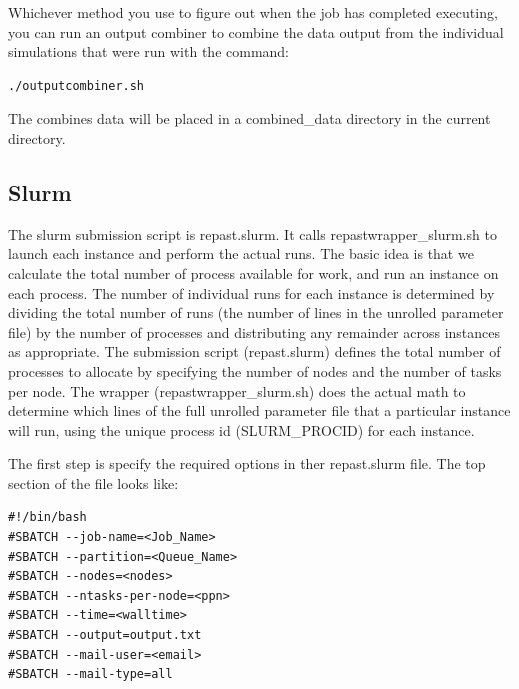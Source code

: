\documentclass[11pt]{amsart}
\begin{document}
Whichever method you use to figure out when the job has completed executing, you can run an output combiner to combine the data output from the individual simulations that were run with the command:
\begin{verbatim}
./outputcombiner.sh
\end{verbatim}
The combines data will be placed in a combined\_data directory in the current directory.

\subsection{Slurm}
The slurm submission script is repast.slurm. It calls repastwrapper\_slurm.sh to launch each instance and perform the actual runs. The basic idea is that we calculate the total number of process available for work, and run an instance on each process. The number of individual runs for each instance is determined by dividing the total number of runs (the number of lines in the unrolled parameter file) by the number of processes and distributing any remainder across instances as appropriate.  The submission script (repast.slurm) defines the total number of processes to allocate by specifying the number of nodes and the number of tasks per node. The wrapper (repastwrapper\_slurm.sh) does the actual math to determine which lines of the full unrolled parameter file that a particular instance will run, using the unique process id (SLURM\_PROCID) for each instance.

The first step is specify the required options in ther repast.slurm file. The top section of the file looks like:
\begin{verbatim}
#!/bin/bash
#SBATCH --job-name=<Job_Name>                                                                                   
#SBATCH --partition=<Queue_Name>                                                                                
#SBATCH --nodes=<nodes>                                                                                         
#SBATCH --ntasks-per-node=<ppn>                                                                                 
#SBATCH --time=<walltime>                                                                                       
#SBATCH --output=output.txt                                                                                     
#SBATCH --mail-user=<email>                                                                                     
#SBATCH --mail-type=all                                                                                         
\end{verbatim}
\end{document}
